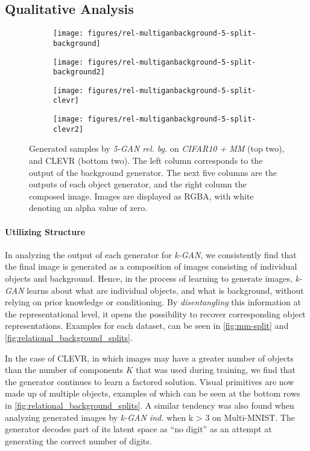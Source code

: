 \documentclass{article}
\begin{document}
\subsection{Qualitative Analysis}\begin{figure}
\centering
\begin{subfigure}[b]{\textwidth}
  \texttt{[image: figures/rel-multiganbackground-5-split-background]}
\end{subfigure}
\begin{subfigure}[b]{\textwidth}
  \texttt{[image: figures/rel-multiganbackground-5-split-background2]}
\end{subfigure}
\begin{subfigure}[b]{\textwidth}
  \texttt{[image: figures/rel-multiganbackground-5-split-clevr]}
\end{subfigure}
\begin{subfigure}[b]{\textwidth}
  \texttt{[image: figures/rel-multiganbackground-5-split-clevr2]}
\end{subfigure}
\caption{Generated samples by \emph{5-GAN rel. bg.} on \emph{CIFAR10 + MM} (top two), and CLEVR (bottom two). The left column corresponds to the output of the background generator. The next five columns are the outputs of each object generator, and the right column the composed image. Images are displayed as RGBA, with white denoting an alpha value of zero.}
\label{fig:relational_background_splits}
\end{figure}\paragraph{Utilizing Structure}
In analyzing the output of each generator for \emph{k-GAN}, we consistently find that the final image is generated as a composition of images consisting of individual objects and background.
Hence, in the process of learning to generate images, \emph{k-GAN} learns about what are individual objects, and what is background, without relying on prior knowledge or conditioning.
By \emph{disentangling} this information at the representational level, it opens the possibility to recover corresponding object representations. 
Examples for each dataset, can be seen in \autoref{fig:mm-split} and \autoref{fig:relational_background_splits}.

In the case of CLEVR, in which images may have a greater number of objects than the number of components $K$ that was used during training, we find that the generator continues to learn a factored solution.
Visual primitives are now made up of multiple objects, examples of which can be seen at the bottom rows in \autoref{fig:relational_background_splits}.
A similar tendency was also found when analyzing generated images by \emph{k-GAN ind.} when k > 3 on Multi-MNIST.  
The generator decodes part of its latent space as ``no digit'' as an attempt at generating the correct number of digits.
\end{document}
